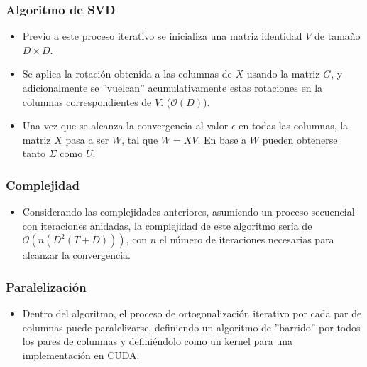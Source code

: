 \begin{frame}
\frametitle{Algoritmo de SVD}
\begin{itemize}
    \item Previo a este proceso iterativo se inicializa una matriz identidad $V$ de tamaño $D \times D$.
    \item Se aplica la rotación obtenida a las columnas de $X$ usando la matriz $G$, y adicionalmente se ''vuelcan'' acumulativamente estas rotaciones en la columnas correspondientes de $V$. ($\mathcal{O} (D)$).
    \item Una vez que se alcanza la convergencia al valor $\epsilon$ en todas las columnas, la matriz $X$ pasa a ser $W$, tal que $W = XV$. En base a $W$ pueden obtenerse tanto $\Sigma$ como $U$.
\end{itemize}
\end{frame}

\begin{frame}
\frametitle{Complejidad}
\begin{itemize}
    \item Considerando las complejidades anteriores, asumiendo un proceso secuencial con iteraciones anidadas, la complejidad de este algoritmo sería de
    $\mathcal{O}(n(D^2(T+D)))$, con $n$ el número de iteraciones necesarias para alcanzar la convergencia.
\end{itemize}
\end{frame}

\begin{frame}
\frametitle{Paralelización}
\begin{itemize}
    \item Dentro del algoritmo, el proceso de ortogonalización iterativo por cada par de columnas puede paralelizarse, definiendo un algoritmo de ''barrido''
    por todos los pares de columnas y definiéndolo como un kernel para una implementación en CUDA.
\end{itemize}
\end{frame}

